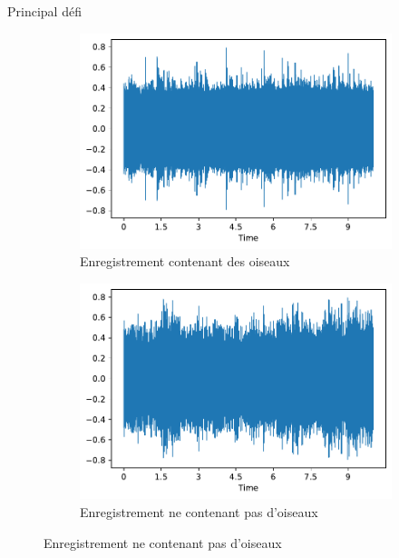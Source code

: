 \documentclass[compress,xcolor=table]{beamer}
\begin{document}
\begin{frame}{Principal défi}

    \begin{figure}[ht]
        \centering
        \begin{subfigure}[b]{0.45\textwidth}
            \includegraphics[width=\textwidth]{images/audio/birds.wave.birdvox.pdf}
            \caption{Enregistrement contenant des oiseaux}
            \label{fig:birds.wave.birdvox}
        \end{subfigure}
        \hfill
        \begin{subfigure}[b]{0.45\textwidth}
            \centering
            \includegraphics[width=\textwidth]{images/audio/nobirds.wave.birdvox.pdf}
            \caption{Enregistrement ne contenant pas d'oiseaux}
            \label{fig:nobirds.wave.birdvox}
        \end{subfigure}


\end{figure}
\end{frame}
\end{document}
